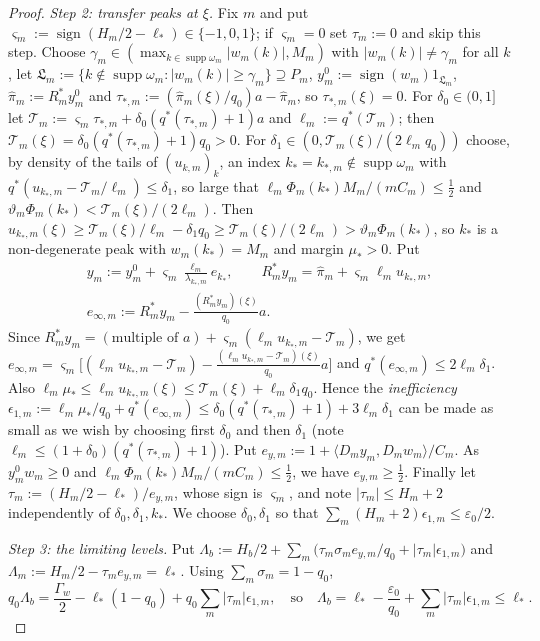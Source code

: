 \documentclass[10pt]{amsart}
\theoremstyle{definition}
\theoremstyle{remark}
\newcommand{\supp}{\operatorname{supp}}
\newcommand{\sgn}{\operatorname{sign}}
\newcommand{\ip}[2]{\langle #1,#2\rangle}
\begin{document}
\begin{proof}
\emph{Step 2: transfer peaks at $\xi$.}  Fix $m$ and put
$\varsigma_m:=\sgn(H_m/2-\ell_*)\in\{-1,0,1\}$; if $\varsigma_m=0$ set
$\tau_m:=0$ and skip this step.  Choose $\gamma_m\in(\max_{k\in\supp\omega_m}
|w_m(k)|,M_m)$ with $|w_m(k)|\ne\gamma_m$ for all $k$, let
$\mathfrak L_m:=\{k\notin\supp\omega_m:|w_m(k)|\ge\gamma_m\}\supseteq P_m$,
$y^0_m:=\sgn(w_m)1_{\mathfrak L_m}$, $\hat\pi_m:=R_m^*y^0_m$ and
$\tau_{*,m}:=(\hat\pi_m(\xi)/q_0)a-\hat\pi_m$, so $\tau_{*,m}(\xi)=0$.  For
$\delta_0\in(0,1]$ let $\mathcal T_m:=\varsigma_m\tau_{*,m}+\delta_0(q^*(\tau_{*,m})+1)
a$ and $\ell_m:=q^*(\mathcal T_m)$; then $\mathcal T_m(\xi)=\delta_0(q^*(\tau_{*,m})+1)q_0>0$.
For $\delta_1\in(0,\mathcal T_m(\xi)/(2\ell_mq_0))$ choose, by density of the tails
of $(u_{k,m})_k$, an index $k_*=k_{*,m}\notin\supp\omega_m$ with
$q^*(u_{k_*,m}-\mathcal T_m/\ell_m)\le\delta_1$, so large that $\ell_m\Phi_m(k_*)
M_m/(mC_m)\le\frac12$ and $\vartheta_m\Phi_m(k_*)<\mathcal T_m(\xi)/(2\ell_m)$.  Then
$u_{k_*,m}(\xi)\ge \mathcal T_m(\xi)/\ell_m-\delta_1q_0\ge \mathcal T_m(\xi)/(2\ell_m)>
\vartheta_m\Phi_m(k_*)$, so $k_*$ is a non-degenerate peak with
$w_m(k_*)=M_m$ and margin $\mu_*>0$.  Put
\begin{gather*}
 y_m:=y^0_m+\varsigma_m\frac{\ell_m}{\lambda_{k_*,m}}e_{k_*},\qquad
 R_m^*y_m=\hat\pi_m+\varsigma_m\ell_mu_{k_*,m},\\
 e_{\infty,m}:=R_m^*y_m-\frac{(R_m^*y_m)(\xi)}{q_0}a .
\end{gather*}
Since $R_m^*y_m=(\text{multiple of }a)+\varsigma_m(\ell_mu_{k_*,m}-\mathcal T_m)$, we get
$e_{\infty,m}=\varsigma_m\big[(\ell_mu_{k_*,m}-\mathcal T_m)-\frac{(\ell_mu_{k_*,m}-
\mathcal T_m)(\xi)}{q_0}a\big]$ and $q^*(e_{\infty,m})\le2\ell_m\delta_1$.  Also
$\ell_m\mu_*\le\ell_mu_{k_*,m}(\xi)\le \mathcal T_m(\xi)+\ell_m\delta_1q_0$.  Hence the
\emph{inefficiency} $\epsilon_{1,m}:=\ell_m\mu_*/q_0+q^*(e_{\infty,m})\le
\delta_0(q^*(\tau_{*,m})+1)+3\ell_m\delta_1$ can be made as small as we
wish by choosing first $\delta_0$ and then $\delta_1$ (note $\ell_m\le
(1+\delta_0)(q^*(\tau_{*,m})+1)$).  Put
$e_{y,m}:=1+\ip{D_my_m}{D_mw_m}/C_m$.  As $y^0_mw_m\ge0$ and
$\ell_m\Phi_m(k_*)M_m/(mC_m)\le\frac12$, we have $e_{y,m}\ge\frac12$.
Finally let $\tau_m:=(H_m/2-\ell_*)/e_{y,m}$, whose sign is $\varsigma_m$, and
note $|\tau_m|\le H_m+2$ independently of $\delta_0,\delta_1,k_*$.  We
choose $\delta_0,\delta_1$ so that $\sum_m(H_m+2)\epsilon_{1,m}\le\varepsilon_0/2$.

\emph{Step 3: the limiting levels.}  Put
$\Lambda_b:=H_b/2+\sum_m\big(\tau_m\sigma_me_{y,m}/q_0+|\tau_m|
\epsilon_{1,m}\big)$ and $\Lambda_m:=H_m/2-\tau_me_{y,m}=\ell_*$.  Using
$\sum_m\sigma_m=1-q_0$,
\[
 q_0\Lambda_b=\frac{\Gamma_w}2-\ell_*(1-q_0)+q_0\sum_m|\tau_m|\epsilon_{1,m},
 \quad\text{so}\quad
 \Lambda_b=\ell_*-\frac{\varepsilon_0}{q_0}+\sum_m|\tau_m|\epsilon_{1,m}\le \ell_* .
\]


\end{proof}
\end{document}
